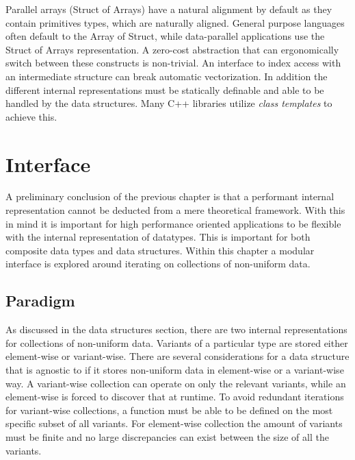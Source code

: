 \documentclass{article}
\begin{document}
Parallel arrays (Struct of Arrays) have a natural alignment by default as they contain primitives types, which are naturally aligned.
General purpose languages often default to the Array of Struct, while data-parallel applications use the Struct of Arrays representation.
A zero-cost abstraction that can ergonomically switch between these constructs is non-trivial.
An interface to index access with an intermediate structure can break automatic vectorization\cite{abstraction-vectorization}. 
In addition the different internal representations must be statically definable and able to be handled by the data structures.
Many C++ libraries utilize {\it class templates} to achieve this\cite{abstraction-vectorization}.

\newpage

\section{Interface}

A preliminary conclusion of the previous chapter is that a performant internal representation cannot be deducted from a mere theoretical framework.
With this in mind it is important for high performance oriented applications to be flexible with the internal representation of datatypes.
This is important for both composite data types and data structures.
Within this chapter a modular interface is explored around iterating on collections of non-uniform data.

\subsection{Paradigm}

As discussed in the data structures section, there are two internal representations for collections of non-uniform data.
Variants of a particular type are stored either element-wise or variant-wise.
There are several considerations for a data structure that is agnostic to if it stores non-uniform data in element-wise or a variant-wise way.
A variant-wise collection can operate on only the relevant variants, while an element-wise is forced to discover that at runtime.
To avoid redundant iterations for variant-wise collections, a function must be able to be defined on the most specific subset of all variants.
For element-wise collection the amount of variants must be finite and no large discrepancies can exist between the size of all the variants.
\end{document}
